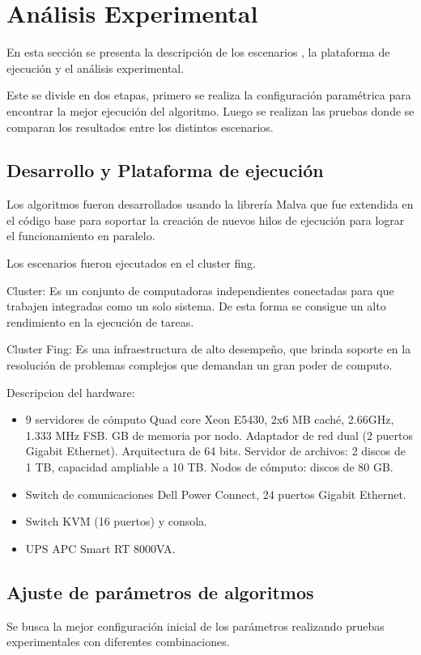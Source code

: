\chapter{Análisis Experimental}
En esta sección se presenta la descripción de los escenarios , la plataforma de ejecución y el análisis experimental.

Este se divide en dos etapas, primero se realiza la configuración paramétrica para encontrar la mejor ejecución del algoritmo. Luego se realizan las pruebas donde se comparan los resultados entre los distintos escenarios.






\section{Desarrollo y Plataforma de ejecución }
Los algoritmos fueron desarrollados usando la librería Malva que fue extendida en el código base para soportar la creación de nuevos hilos de ejecución para lograr el funcionamiento en paralelo.


Los escenarios fueron ejecutados en el cluster fing.

Cluster: Es un conjunto de computadoras independientes conectadas para que trabajen integradas como un solo sistema. De esta forma se consigue un alto rendimiento en la ejecución de tareas. 

Cluster Fing: Es una infraestructura de alto desempeño, que brinda soporte en la resolución de problemas complejos que demandan un gran poder de computo.

Descripcion del hardware: 
\begin{itemize}
	\item 9 servidores de cómputo
	\subitem Quad core Xeon E5430, 2x6 MB caché, 2.66GHz, 1.333 MHz FSB.
	 GB de memoria por nodo.
	\subitem Adaptador de red dual (2 puertos Gigabit Ethernet).
	\subitem  Arquitectura de 64 bits.
	\subitem Servidor de archivos: 2 discos de 1 TB, capacidad ampliable a 10 TB.
	\subitem Nodos de cómputo: discos de 80 GB.
	\item Switch de comunicaciones
	\subitem Dell Power Connect, 24 puertos Gigabit Ethernet.
	\item Switch KVM (16 puertos) y consola.
	\item UPS APC Smart RT 8000VA.
\end{itemize}

\section{Ajuste de parámetros de algoritmos}
Se busca la mejor configuración inicial de los parámetros realizando pruebas experimentales con diferentes combinaciones.  

